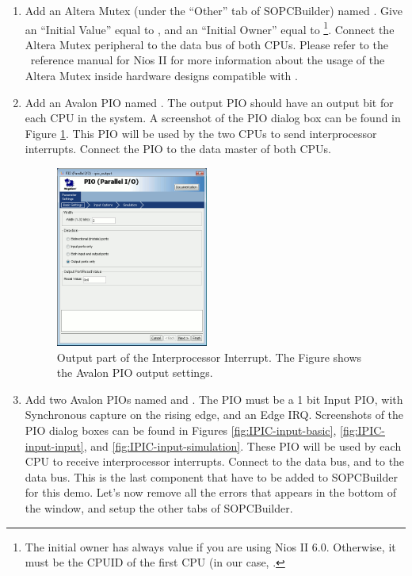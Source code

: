 \begin{enumerate}
\item Add an Altera Mutex (under the ``Other'' tab of SOPCBuilder)
  named . Give an ``Initial Value'' equal to ,
  and an ``Initial Owner'' equal to \footnote{The initial
  owner has always value  if you are using Nios II
  6.0. Otherwise, it must be the CPUID of the first CPU (in our case,
  .}. Connect the Altera Mutex peripheral to the data bus
  of both CPUs. Please refer to the \ee\ reference manual for Nios II 
%
  for more information about the usage of the Altera Mutex inside
  hardware designs compatible with \ee.

\item Add an Avalon PIO named . The output PIO
  should have an output bit for each CPU in the system. A screenshot
  of the PIO dialog box can be found in 
  Figure \ref{fig:IPIC-output}. This
  PIO will be used by the two CPUs to send interprocessor
  interrupts. Connect the PIO to the data master of both CPUs.

\begin{figure}
  \begin{center}
    \includegraphics[width=5cm, bb=0 0 518 614]{images/IPIC_PIO_out_dialogbox.png}
  \end{center}
  \caption{Output part of the Interprocessor Interrupt. 
    The Figure shows the Avalon PIO output settings.}
  \label{fig:IPIC-output}
\end{figure}


\item Add two Avalon PIOs named  and
  . The PIO must be a 1 bit Input PIO, with
  Synchronous capture on the rising edge, and an Edge IRQ. Screenshots
  of the PIO dialog boxes can be found in 
%
  Figures \ref{fig:IPIC-input-basic}, \ref{fig:IPIC-input-input}, and
  \ref{fig:IPIC-input-simulation}. These PIO will be used by each CPU
  to receive interprocessor interrupts. Connect 
  to the  data bus, and  to the
   data bus. This is the last component that have to be
  added to SOPCBuilder for this demo. Let's now remove all the errors
  that appears in the bottom of the window, and setup the other tabs
  of SOPCBuilder.



\end{enumerate}
